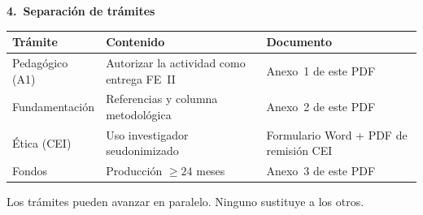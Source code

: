 \documentclass[11pt,a4paper]{scrartcl}
\newcommand{\AnnexTitle}[1]{%
  \clearpage
  \LogoRow
  \begin{center}{\Large\sffamily\bfseries #1}\end{center}
  \vspace{0.4em}
  \noindent{\color{rulegray}\hrule height 0.4pt}
  \vspace{0.5em}
}
\begin{document}
\AnnexTitle{4.\ Separación de trámites}

\renewcommand{\arraystretch}{1.25}
\begin{tabularx}{\textwidth}{@{}>{\raggedright\arraybackslash}p{3.2cm}X>{\raggedright\arraybackslash}p{3.8cm}@{}}
  \toprule
  \textbf{Trámite} & \textbf{Contenido} & \textbf{Documento} \\
  \midrule
  Pedagógico (A1) & Autorizar la actividad como entrega FE~II & Anexo~1 de este PDF \\
  Fundamentación & Referencias y columna metodológica & Anexo~2 de este PDF \\
  Ética (CEI) & Uso investigador seudonimizado & Formulario Word + PDF de remisión CEI \\
  Fondos & Producción $\geq 24$ meses & Anexo~3 de este PDF \\
  \bottomrule
\end{tabularx}

\vspace{0.6em}
\noindent Los trámites pueden avanzar en paralelo. Ninguno sustituye a los otros.

\vspace{1em}
\AIAuthorshipDeclaration

\vspace{0.8em}
\AuthorshipLicenseBlock

\vspace{1em}
\AuthoritiesBlock

\vspace{0.5em}
\LegalEntities
\end{document}
